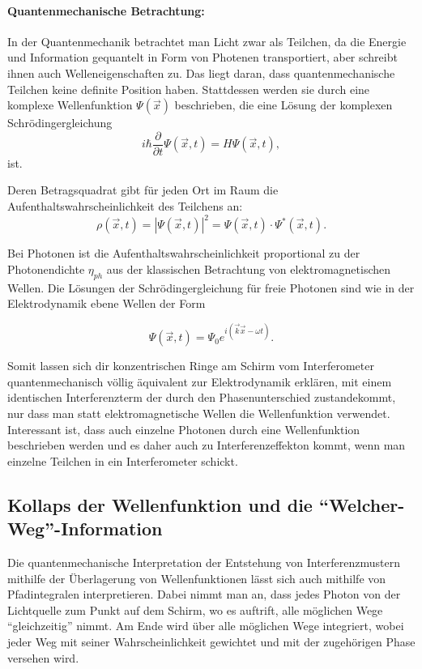 \documentclass[a4paper,ngerman]{scrartcl}
\begin{document}
\paragraph{Quantenmechanische Betrachtung:}
In der Quantenmechanik betrachtet man Licht zwar als Teilchen, da die Energie und Information gequantelt in Form von Photenen
transportiert, aber schreibt ihnen auch Welleneigenschaften zu. Das liegt daran, dass quantenmechanische Teilchen keine definite
Position haben. Stattdessen werden sie durch eine komplexe Wellenfunktion $\Psi(\vec{x})$ beschrieben, die eine Lösung der
komplexen Schrödingergleichung 
\begin{equation}
  i \hbar \frac{\partial}{\partial t} \Psi(\vec{x},t) = H \Psi(\vec{x},t),
\end{equation}
ist.

Deren Betragsquadrat gibt für jeden Ort im Raum die Aufenthaltswahrscheinlichkeit des Teilchens an:
\begin{equation}
  \rho(\vec{x},t) = |\Psi(\vec{x},t)|^2 = \Psi(\vec{x},t) \cdot \Psi^*(\vec{x},t).
\end{equation}

Bei Photonen ist die Aufenthaltswahrscheinlichkeit proportional zu der Photonendichte $\eta_{ph}$ aus der klassischen Betrachtung von elektromagnetischen Wellen. Die Lösungen der Schrödingergleichung für freie Photonen sind wie in der Elektrodynamik ebene Wellen der Form

\begin{equation}
  \Psi(\vec{x},t) = \Psi_0 e^{i(\vec{k}\vec{x}-\omega t)}.
\end{equation}

Somit lassen sich dir konzentrischen Ringe am Schirm vom Interferometer quantenmechanisch völlig äquivalent zur Elektrodynamik erklären,
mit einem identischen Interferenzterm der durch den Phasenunterschied zustandekommt,
nur dass man statt elektromagnetische Wellen die Wellenfunktion verwendet. \\

Interessant ist, dass auch einzelne Photonen durch eine Wellenfunktion beschrieben werden und es daher auch zu Interferenzeffekton kommt,
wenn man einzelne Teilchen in ein Interferometer schickt.


\subsection{Kollaps der Wellenfunktion und die "`Welcher-Weg"'-Information}
\label{sec:welcher-weg}
Die quantenmechanische Interpretation der Entstehung von Interferenzmustern mithilfe der Überlagerung von Wellenfunktionen lässt sich auch
mithilfe von Pfadintegralen interpretieren. Dabei nimmt man an, dass jedes Photon von der Lichtquelle zum Punkt auf dem Schirm, wo es auftrift,
alle möglichen Wege "`gleichzeitig"' nimmt. Am Ende wird über alle möglichen Wege integriert, wobei jeder Weg mit seiner Wahrscheinlichkeit
gewichtet und mit der zugehörigen Phase versehen wird.\\
\end{document}
